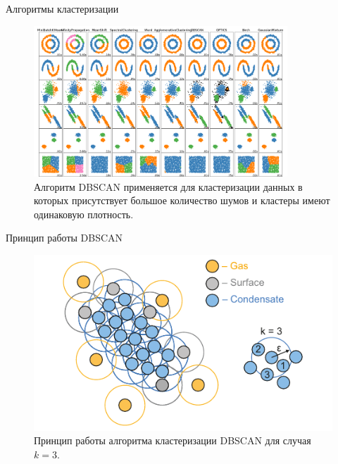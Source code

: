 \documentclass{beamer}
\begin{document}
\begin{frame}{Алгоритмы кластеризации}
\footnotesize{

\begin{figure}[!t]
\begin{center}
\includegraphics[width=0.85\textwidth]{Intersect.png}
\caption{Алгоритм DBSCAN применяется для кластеризации данных в которых присутствует большое количество шумов и кластеры имеют одинаковую плотность.}
\label{sravnenie}
\end{center}
\end{figure}

}

\end{frame}



\begin{frame}{Принцип работы DBSCAN}
\footnotesize{

\begin{figure}[!t]
    \centering
    \includegraphics[width=0.9\linewidth]{kepsilon.pdf}
    \caption{Принцип работы алгоритма кластеризации DBSCAN для случая $k = 3$.}
    \label{kepsilon}
\end{figure}
}

\end{frame}
\end{document}
